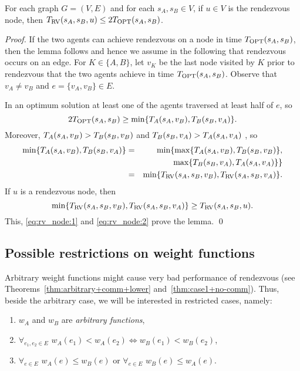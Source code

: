 \documentclass{llncs}
\newcommand{\Topt}[2]{T_{{\scriptsize \textup{OPT}}}(#1,#2)}
\newcommand{\dist}[4][]{\if!#1!T_{#2}(#3,#4)\else T_{#2}(#3,#4,#1)\fi}
\newcommand{\TRV}[3]{T_{{\scriptsize \textup{RV}}}(#1,#2,#3)}
\newcommand{\startpos}[1]{s_{#1}}
\newcommand{\starta}{\startpos{A}}
\newcommand{\startb}{\startpos{B}}
\newcommand{\agentVariable}{K}
\begin{document}
\begin{lemma} \label{lem:meet_on_nodes}
For each graph $G=(V,E)$ and for each $\starta,\startb\in V$, if $u\in V$ is the rendezvous node, then $\TRV{\starta}{\startb}{u} \leq 2\Topt{\starta}{\startb}$.
\end{lemma}
\begin{proof}
If the two agents can achieve rendezvous on a node in time $\Topt{\starta}{\startb}$, then the lemma follows and hence we assume in the following that rendezvous occurs on an edge.
For ${\agentVariable}\in\{A,B\}$, let $v_{\agentVariable}$ be the last node visited by ${\agentVariable}$ prior to rendezvous that the two agents achieve in time $\Topt{\starta}{\startb}$.
Observe that $v_A\neq v_B$ and $e=\{v_A,v_B\}\in E$.

In an optimum solution at least one of the agents traversed at least half of $e$, so
\begin{equation} \label{eq:rv_node:1}
	2\Topt{\starta}{\startb} \geq
	\min \{ \dist{A}{\starta}{v_B}, \dist{B}{\startb}{v_A} \}.
\end{equation}
Moreover,  $\dist{A}{\starta}{v_B} > \dist{B}{\startb}{v_B}$ and $\dist{B}{\startb}{v_A} > \dist{A}{\starta}{v_A}$ , so
\begin{eqnarray}
  \min \{ \dist{A}{\starta}{v_B}, \dist{B}{\startb}{v_A} \}
	& =&
	\min \{
		\max \{ \dist{A}{\starta}{v_B}, \dist{B}{\startb}{v_B}\}, \nonumber\\
	& &	\hphantom{\min \{} \max \{ \dist{B}{\startb}{v_A}, \dist{A}{\starta}{v_A}\}
	\} \label{eq:rv_node:2}\\
	&=&
	\min \{ \TRV{\starta}{\startb}{v_B}, \TRV{\starta}{\startb}{v_A} \}. \nonumber
\end{eqnarray}
If $u$ is a rendezvous node, then
\[
  	\min \{ \TRV{\starta}{\startb}{v_B}, \TRV{\starta}{\startb}{v_A} \} \geq \TRV{\starta}{\startb}{u}.
\]
This, \eqref{eq:rv_node:1} and \eqref{eq:rv_node:2} prove the lemma.
\qed\end{proof}

\subsection{Possible restrictions on weight functions}

Arbitrary weight functions might cause very bad performance of rendezvous (see Theorems~\ref{thm:arbitrary+comm+lower} and~\ref{thm:case1+no-comm}).
Thus, beside the arbitrary case, we will be interested in restricted cases, namely:
\begin{enumerate}
\item \label{arbitraryW} $w_A$ and $w_B$ are \emph{arbitrary functions},
\item \label{monotoneEdges}  $\forall_{e_1, e_2 \in E} \,\, w_A(e_1) < w_A(e_2) \iff w_B(e_1) < w_B(e_2)$,
\item \label{monotoneAgents} $\forall_{e \in E} \,\, w_A(e) \leq w_B(e)$ or $\forall_{e \in E} \,\, w_B(e) \leq w_A(e)$.
\end{enumerate}
\end{document}
